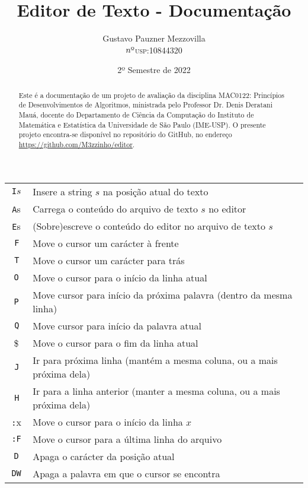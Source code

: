 \documentclass[a4paper, 11pt]{article}
\title{\textbf{Editor de Texto - Documentação}}
\author{Gustavo Pauzner Mezzovilla\\ \texorpdfstring{$n{\text{\textordmasculine}}$}{nº}\textsc{usp}:10844320}
\date{2º Semestre de 2022}
\begin{document}
\maketitle

\begin{abstract}
	Este é a documentação de um projeto de avaliação da disciplina \textsc{MAC0122}: Princípios de Desenvolvimentos de Algoritmos, ministrada pelo Professor Dr. Denis Deratani Mauá, docente do Departamento de Ciência da Computação do Instituto de Matemática e Estatística da Universidade de São Paulo (IME-USP). O presente projeto encontra-se disponível no repositório do GitHub, no endereço \url{https://github.com/M3zzinho/editor}.
\end{abstract}

\begin{table}[H]
      \centering
      \begin{tabularx}{\linewidth}{|c|X|}
      \hline \texttt {I}$s$ & Insere a string $s$ na posição atual do texto  \\
      \texttt {A}s &  Carrega o conteúdo do arquivo de texto $s$ no editor \\
      \texttt{E}s &  (Sobre)escreve o conteúdo do editor no arquivo de texto $s$ \\
      \texttt{ F } &  Move o cursor um carácter à frente \\
      \texttt{ T } &  Move o cursor um carácter para trás \\
      \texttt{O} &  Move o cursor para o início da linha atual \\
      \texttt{P} &  Move cursor para início da próxima palavra (dentro da mesma linha) \\
      \texttt{ Q } &  Move cursor para início da palavra atual \\
      \$ &  Move o cursor para o fim da linha atual \\
      \texttt{ J } &  Ir para próxima linha (mantém a mesma coluna, ou a mais próxima dela) \\
      \texttt{ H } &  Ir para a linha anterior (manter a mesma coluna, ou a mais próxima dela) \\
      \texttt{:}x &  Move o cursor para o início da linha $x$ \\
      \texttt{:F} &  Move o cursor para a última linha do arquivo\\
      \texttt{D} &  Apaga o carácter da posição atual\\
      \texttt{DW} &  Apaga a palavra em que o cursor se encontra\\

\end{tabularx}
\end{table}
\end{document}
